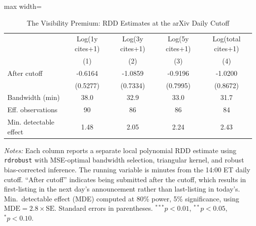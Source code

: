 \begin{table}[htbp]
\centering
\caption{The Visibility Premium: RDD Estimates at the arXiv Daily Cutoff}
\label{tab:main}
\begin{adjustbox}{max width=\textwidth}
\begin{tabular}{lcccc}
\hline\hline
& Log(1y cites+1) & Log(3y cites+1) & Log(5y cites+1) & Log(total cites+1) \\
& (1) & (2) & (3) & (4) \\
\hline
After cutoff & -0.6164 & -1.0859 & -0.9196 & -1.0200 \\
& (0.5277) & (0.7334) & (0.7995) & (0.8672) \\
\hline
Bandwidth (min) & 38.0 & 32.9 & 33.0 & 31.7 \\
Eff. observations & 90 & 86 & 86 & 84 \\
Min. detectable effect & 1.48 & 2.05 & 2.24 & 2.43 \\
\hline\hline
\end{tabular}
\end{adjustbox}
\begin{minipage}{0.95\textwidth}
\footnotesize
\textit{Notes:} Each column reports a separate local polynomial RDD estimate using \texttt{rdrobust} with MSE-optimal bandwidth selection, triangular kernel, and robust bias-corrected inference. The running variable is minutes from the 14:00 ET daily cutoff. ``After cutoff'' indicates being submitted after the cutoff, which results in first-listing in the next day's announcement rather than last-listing in today's. Min.\ detectable effect (MDE) computed at 80\% power, 5\% significance, using $\text{MDE} = 2.8 \times \text{SE}$. Standard errors in parentheses. $^{***}p<0.01$, $^{**}p<0.05$, $^{*}p<0.10$.
\end{minipage}
\end{table}
